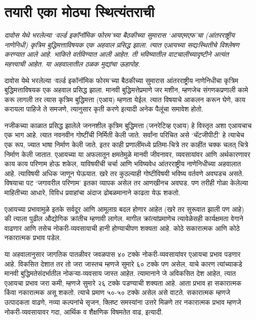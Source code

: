 \chapter{तयारी एका मोठ्या स्थित्यंतराची }

{\textit{दावोस येथे भरलेल्या `वर्ल्ड इकॉनॉमिक फोरम'च्या बैठकीच्या सुमारास `आयएमएफ'चा (आंतरराष्ट्रीय नाणेनिधी) कृत्रिम बुद्धिमत्ताविषयक एक अहवाल प्रसिद्ध झाला. त्यात एआयच्या सद्यःस्थितीचे विश्लेषण करण्यात आले आहे. भाकिते वर्तविण्यात आली आहेत. ती भविष्यातील वाटचालीच्यादृष्टीने अत्यंत महत्त्वाची आहेत. या अहवालातील ठळक मुद्यांचा ऊहापोह.}}

\vspace{1.5em}

दावोस येथे भरलेल्या `वर्ल्ड इकॉनॉमिक फोरम'च्या बैठकीच्या सुमारास आंतरराष्ट्रीय नाणेनिधीचा कृत्रिम बुद्धिमत्ताविषयक एक अहवाल प्रसिद्ध झाला. मानवी बुद्धिमत्तेप्रमाणे जर मशीन, म्हणजेच संगणकप्रणाली कामे करू लागली तर त्यास कृत्रिम बुद्धिमत्ता (एआय) म्हणता येईल. त्यात विषयाचे आकलन करून घेणे, काय करायला पाहिजे ते समजणे, त्यानुसार कृती करणे इत्यादी अनेक पैलूंचा समावेश होतो.

नजीकच्या काळात प्रसिद्ध झालेले जननशील कृत्रिम बुद्धिमत्ता (जनरेटिव्ह एआय) हे विस्तृत अशा एआयचाच एक भाग आहे. त्यात नवनवीन गोष्टींची निर्मिती केली जाते. सर्वांना परिचित असे `चॅटजीपीटी' हे त्याचेच एक रूप, ज्यात भाषा निर्माण केली जाते. इतर काही प्रणालींमध्ये प्रतिमा-चित्रे तर काहींत चक्क चलत् चित्रे निर्माण केली जातात. एआयच्या या अफलातून क्षमतेमुळे मानवी जीवनावर, व्यवसायांवर आणि अर्थकारणावर काय काय परिणाम होऊ शकेल, याविषयीची चर्चा आणि भविष्यवेध आंतरराष्ट्रीय नाणेनिधीच्या अहवालात आहे. त्याविषयी अधिक जाणून घेऊयात. खरे तर कुठल्याही गोष्टीविषयी भविष्य वर्तवणे अवघडच असते. विषयाचा पट `जगावरील परिणाम' इतका व्यापक असेल तर आणखीनच अवघड. पण तरीही गोळा केलेल्या माहितीच्या आधारे, विविध प्रवाहांचा अंदाज ढोबळमानाने काढता येऊ शकतो.

एआयच्या प्रभावामुळे इतके सर्वदूर आणि आमूलाग्र बदल होणार आहेत (खरे तर सुरूवात झाली पण आहे) की त्याला पुढील औद्योगिक क्रांतीच म्हणावी लागेल. मागील क्रांत्यांप्रमाणेच त्यावेळेसही कार्यक्षमता वेगाने वाढणार आणि तसेच नोकरी-व्यवसायाची हानी होण्याचीपण शक्यता आहे. कोठे सकारात्मक आणि कोठे नकारात्मक प्रभाव पडेल.

या अहवालानुसार जागतिक पातळीवर जवळपास ४० टक्के नोकरी-व्यवसायांवर एआयचा प्रभाव पडणार आहे. विकसित देशात तर तो जरा जास्तच म्हणजे सुमारे ६० टक्के पण असेल, याचे कारण त्यांच्याकडे मानवी बुद्धिमतेसंदर्भातील नोकऱ्या-व्यवसाय जास्त आहेत. त्यामानाने जे अविकसित देश आहेत, त्यात एआयचा प्रभाव जरा कमी, म्हणजे सुमारे २६ टक्के पडण्याची शक्यता आहे. आता प्रभाव हा सकारात्मक किंवा नकारात्मक असू शकतो. त्याचे प्रमाण ५०-५० टक्के असेल असे वाटते. सकारात्मक म्हणजे उत्पादकता वाढणे, नव्या कल्पनांचे सृजन, क्लिष्ट समस्यांना उत्तरे मिळणे तर नकारात्मक प्रभाव म्हणजे नोकरी-व्यवसायावर गदा, आर्थिक व शैक्षणिक  विषमतेत वाढ, इत्यादी.

